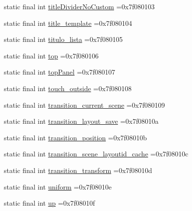 \begin{DoxyCompactItemize}
static final int \mbox{\hyperlink{classbr_1_1unb_1_1cic_1_1mp_1_1marketmaster_1_1R_1_1id_a658d51b5469eda5eb7d2edec094c3c72}{title\+Divider\+No\+Custom}} =0x7f080103
\item 
static final int \mbox{\hyperlink{classbr_1_1unb_1_1cic_1_1mp_1_1marketmaster_1_1R_1_1id_a43402cf131cf4d2e3a33d55ad8defe63}{title\+\_\+template}} =0x7f080104
\item 
static final int \mbox{\hyperlink{classbr_1_1unb_1_1cic_1_1mp_1_1marketmaster_1_1R_1_1id_ad01a0951ebc5009d78ed80fac40b8546}{titulo\+\_\+lista}} =0x7f080105
\item 
static final int \mbox{\hyperlink{classbr_1_1unb_1_1cic_1_1mp_1_1marketmaster_1_1R_1_1id_a2448c05df160233da658df152db32873}{top}} =0x7f080106
\item 
static final int \mbox{\hyperlink{classbr_1_1unb_1_1cic_1_1mp_1_1marketmaster_1_1R_1_1id_a815ef865b1ca31b822f635bb5f02806c}{top\+Panel}} =0x7f080107
\item 
static final int \mbox{\hyperlink{classbr_1_1unb_1_1cic_1_1mp_1_1marketmaster_1_1R_1_1id_af4fc5ebd0487ada3985ae40feb4361ea}{touch\+\_\+outside}} =0x7f080108
\item 
static final int \mbox{\hyperlink{classbr_1_1unb_1_1cic_1_1mp_1_1marketmaster_1_1R_1_1id_aaa623efb0a0642a39f8dcc59a30bc4ef}{transition\+\_\+current\+\_\+scene}} =0x7f080109
\item 
static final int \mbox{\hyperlink{classbr_1_1unb_1_1cic_1_1mp_1_1marketmaster_1_1R_1_1id_a9138c4ecad177354ce0409516adc4d11}{transition\+\_\+layout\+\_\+save}} =0x7f08010a
\item 
static final int \mbox{\hyperlink{classbr_1_1unb_1_1cic_1_1mp_1_1marketmaster_1_1R_1_1id_a36e5ba735913a4e64a7a099bc6d2dc4b}{transition\+\_\+position}} =0x7f08010b
\item 
static final int \mbox{\hyperlink{classbr_1_1unb_1_1cic_1_1mp_1_1marketmaster_1_1R_1_1id_aaad9a69143afe32732a9fc534cf37ac5}{transition\+\_\+scene\+\_\+layoutid\+\_\+cache}} =0x7f08010c
\item 
static final int \mbox{\hyperlink{classbr_1_1unb_1_1cic_1_1mp_1_1marketmaster_1_1R_1_1id_a5ebd2efb316bd9461569881810e95984}{transition\+\_\+transform}} =0x7f08010d
\item 
static final int \mbox{\hyperlink{classbr_1_1unb_1_1cic_1_1mp_1_1marketmaster_1_1R_1_1id_a71bd6b6bf34abcf55f0304147a84edf2}{uniform}} =0x7f08010e
\item 
static final int \mbox{\hyperlink{classbr_1_1unb_1_1cic_1_1mp_1_1marketmaster_1_1R_1_1id_a1d057a667f5bff676a89148e5824c81e}{up}} =0x7f08010f

\end{DoxyCompactItemize}
